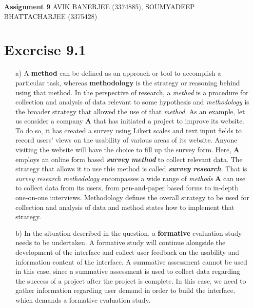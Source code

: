 \documentclass[a4paper]{article}
\begin{document}
	\begin{center}
		\textbf{\LARGE Assignment 9}\linebreak\linebreak
		{\large AVIK BANERJEE (3374885), SOUMYADEEP BHATTACHARJEE (3375428)}
	\end{center}
\section*{Exercise 9.1}
\begin{enumerate}
\item[a)] A \textbf{method} can be defined as an approach or tool to accomplish a particular task, whereas \textbf{methodology} is the strategy or reasoning behind using that method. In the perspective of research, a \textit{method} is a procedure for collection and analysis of data relevant to some hypothesis and \textit{methodology} is the broader strategy that allowed the use of that \textit{method}. \linebreak\linebreak
As an example, let us consider a company \textbf{A} that has initiated a project to improve its website. To do so, it has created a survey using Likert scales and text input fields to record users' views on the usability of various areas of its website. Anyone visiting the website will have the choice to fill up the survey form. Here, \textbf{A} employs an online form based \textit{\textbf{survey method}} to collect relevant data. The strategy that allows it to use this method is called \textbf{\textit{survey research}}. That is \textit{survey research methodology} encompasses a wide range of \textit{methods} \textbf{A} can use to collect data from its users, from pen-and-paper based forms to in-depth one-on-one interviews. Methodology defines the overall strategy to be used for collection and analysis of data and method states how to implement that strategy.
\item[b)] In the situation described in the question, a \textbf{formative} evaluation study needs to be undertaken. A formative study will continue alongside the development of the interface and collect user feedback on the usability and information content of the interface. A summative assessment cannot be used in this case, since a summative assessment is used to collect data regarding the success of a project after the project is complete. In this case, we need to gather information regarding user demand in order to build the interface, which demands a formative evaluation study. 

\end{enumerate}
\end{document}
